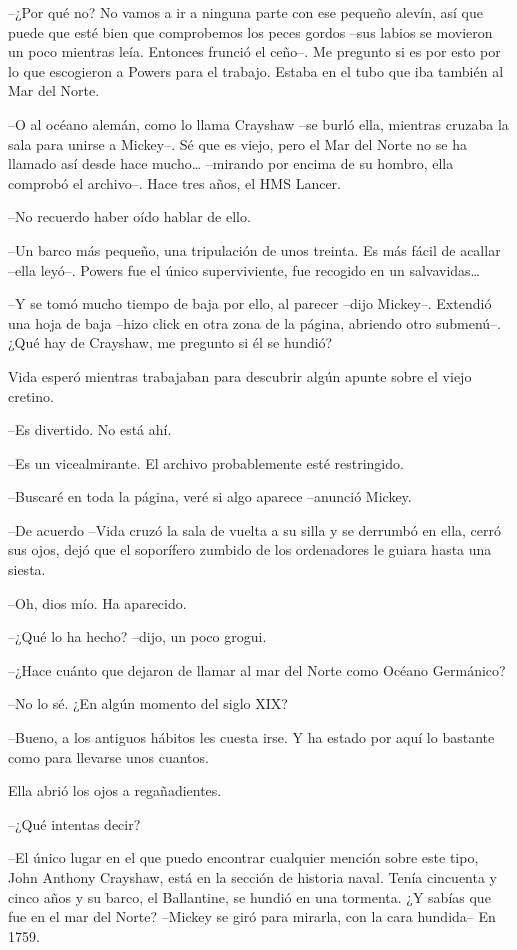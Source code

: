 {--¿Por qué no? No vamos a ir a ninguna parte con ese pequeño alevín,
 así que puede que esté bien que comprobemos los peces gordos --sus
 labios se movieron un poco mientras leía. Entonces frunció el ceño--. Me
 pregunto si es por esto por lo que escogieron a Powers para el trabajo.
Estaba en el tubo que iba también al Mar del Norte.}

{--O al océano alemán, como lo llama Crayshaw --se burló ella, mientras
 cruzaba la sala para unirse a Mickey--. Sé que es viejo, pero el Mar del
 Norte no se ha llamado así desde hace mucho\ldots{} --mirando por encima
 de su hombro, ella comprobó el archivo--. Hace tres años, el HMS
Lancer.}

{--No recuerdo haber oído hablar de ello.}

{--Un barco más pequeño, una tripulación de unos treinta. Es más fácil
 de acallar --ella leyó--. Powers fue el único superviviente, fue
 recogido en un salvavidas\ldots{}}

{--Y se tomó mucho tiempo de baja por ello, al parecer --dijo Mickey--.
 Extendió una hoja de baja --hizo click en otra zona de la página,
 abriendo otro submenú--. ¿Qué hay de Crayshaw, me pregunto si él se
hundió?}

{Vida esperó mientras trabajaban para descubrir algún apunte sobre el
viejo cretino.}

{--Es divertido. No está ahí.}

{--Es un vicealmirante. El archivo probablemente esté restringido.}

{--Buscaré en toda la página, veré si algo aparece --anunció Mickey.}

{--De acuerdo --Vida cruzó la sala de vuelta a su silla y se derrumbó en
 ella, cerró sus ojos, dejó que el soporífero zumbido de los ordenadores
le guiara hasta una siesta.}

{--Oh, dios mío. Ha aparecido.}

{--¿Qué lo ha hecho? --dijo, un poco grogui.}

{--¿Hace cuánto que dejaron de llamar al mar del Norte como Océano
Germánico?}

{--No lo sé. ¿En algún momento del siglo XIX?}

{--Bueno, a los antiguos hábitos les cuesta irse. Y ha estado por aquí
lo bastante como para llevarse unos cuantos.}

{Ella abrió los ojos a regañadientes.}

{--¿Qué intentas decir?}

{--El único lugar en el que puedo encontrar cualquier mención sobre este
 tipo, John Anthony Crayshaw, está en la sección de historia naval. Tenía
 cincuenta y cinco años y su barco, el Ballantine, se hundió en una
 tormenta. ¿Y sabías que fue en el mar del Norte? --Mickey se giró para
mirarla, con la cara hundida-- En 1759.}

